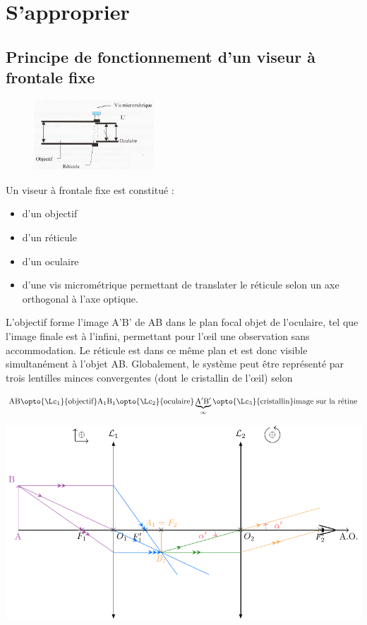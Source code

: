 \documentclass[../main/main.tex]{subfiles}
\begin{document}
\section{S'approprier}

\subsection{Principe de fonctionnement d'un viseur à frontale fixe}

\begin{figure}
	\vspace*{-40pt}
	\begin{center}
		\includegraphics[width=0.4\textwidth]{dispositif}
	\end{center}
\end{figure}

Un viseur à frontale fixe est constitué :

\begin{itemize}
	\item d'un objectif
	\item d'un réticule
	\item d'un oculaire
	\item d'une vis micrométrique permettant de translater le réticule selon un
	      axe orthogonal à l'axe optique.
\end{itemize}

L'objectif forme l'image A'B' de AB dans le plan focal objet de l'oculaire,
tel que l'image finale est à l'infini, permettant pour l'œil une observation
sans accommodation. Le réticule est dans ce même plan et est donc visible
simultanément à l'objet AB. Globalement, le système peut être représenté par
trois lentilles minces convergentes (dont le cristallin de l'œil) selon

\[
	\rm AB
	\opto{\Lc_1}{\text{objectif}}
	A_1B_1
	\opto{\Lc_2}{\text{oculaire}}
	\underbrace{\rm A'B'}_{\infty}
	\opto{\Lc_3}{\text{cristallin}}
	\text{image sur la rétine}
\]

\begin{center}
	\includegraphics[width=.7\linewidth]{microscope}
\end{center}
\end{document}
